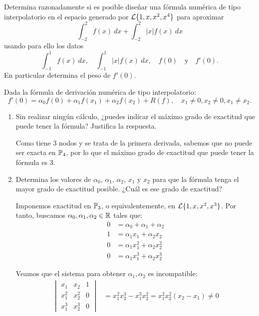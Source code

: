 \begin{ejercicio}\label{ej:2.2.4}
    Determina razonadamente si es posible diseñar una fórmula numérica de tipo interpolatorio en el espacio generado por $\mathcal{L}\{1, x, x^2, x^4\}$ para aproximar
    \[
    \int_{-2}^{2} f(x) \ d{x} + \int_{-2}^{2} |x|f(x) \ d{x}
    \]
    usando para ello los datos
    \[
    \int_{-1}^{1} f(x) \ d{x}, \quad \int_{-1}^{1} |x|f(x) \ d{x}, \quad f(0) \quad \text{y} \quad f'(0).
    \]
    En particular determina el peso de $f'(0)$.
\end{ejercicio}

\begin{ejercicio}\label{ej:2.2.5}
    Dada la fórmula de derivación numérica de tipo interpolatorio:
    \[
    f'(0) = \alpha_0 f(0) + \alpha_1 f(x_1) + \alpha_2 f(x_2) + R(f), \quad x_1 \neq 0, x_2 \neq 0, x_1 \neq x_2.
    \]
    \begin{enumerate}
        \item Sin realizar ningún cálculo, ¿puedes indicar el máximo grado de exactitud que puede tener la fórmula? Justifica la respuesta.
        
        Como tiene $3$ nodos y se trata de la primera derivada, sabemos que no puede ser exacta en $\mathbb{P}_4$, por lo que el máximo grado de exactitud que puede tener la fórmula es $3$.
        
        \item Determina los valores de $\alpha_0$, $\alpha_1$, $\alpha_2$, $x_1$ y $x_2$ para que la fórmula tenga el mayor grado de exactitud posible. ¿Cuál es ese grado de exactitud?
        
        Imponemos exactitud en $\mathbb{P}_3$, o equivalentemente, en $\mathcal{L}\{1, x, x^2,x^3\}$. Por tanto, buscamos $\alpha_0,\alpha_1,\alpha_2\in\mathbb{R}$ tales que:
        \begin{align*}
            0 &= \alpha_0 + \alpha_1 + \alpha_2 \\
            1 &= \alpha_1x_1 + \alpha_2x_2 \\
            0 &= \alpha_1x_1^2 + \alpha_2x_2^2 \\
            0 &= \alpha_1x_1^3 + \alpha_2x_2^3
        \end{align*}

        Veamos que el sistema para obtener $\alpha_1,\alpha_2$ es incompatible:
        \begin{align*}
            \begin{vmatrix}
                x_1 & x_2 & 1 \\
                x_1^2 & x_2^2 & 0 \\
                x_1^3 & x_2^3 & 0
            \end{vmatrix} &= x_1^2x_2^3 - x_1^3x_2^2 = x_1^2x_2^2(x_2-x_1) \neq 0
        \end{align*}


\end{enumerate}
\end{ejercicio}
